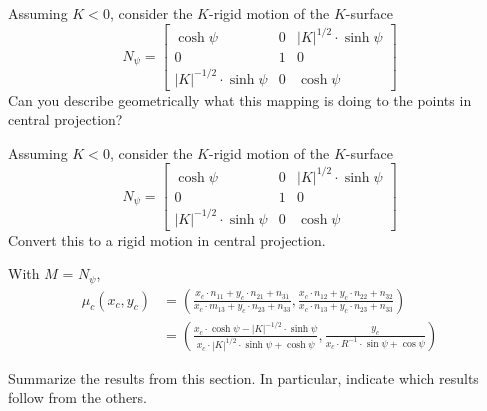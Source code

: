 \documentclass{ximera}
\begin{document}
\begin{problem}
  Assuming $K < 0$, consider the $K$-rigid motion of the $K$-surface
  \[
  N_\psi=
  \begin{bmatrix}
    \cosh\psi & 0 & |K|^{1/2}\cdot\sinh\psi\\
    0 & 1 & 0\\
    |K|^{-1/2}\cdot\sinh\psi & 0 & \cosh\psi
  \end{bmatrix}
  \]
  Can you describe geometrically what this mapping is doing to the
  points in central projection?
\end{problem}

  
\begin{problem}
  Assuming $K < 0$, consider the $K$-rigid motion of the $K$-surface
  \[
  N_\psi=
  \begin{bmatrix}
    \cosh\psi & 0 & |K|^{1/2}\cdot\sinh\psi\\
    0 & 1 & 0\\
    |K|^{-1/2}\cdot\sinh\psi & 0 & \cosh\psi
  \end{bmatrix}
  \]
  Convert this to a rigid motion in central projection.
  
    \begin{freeResponse}
   With $M$ = $N_\psi$,
  \begin{align*}
  \mu_c(x_c,y_c) &= \left( \frac{x_c\cdot n_{11} + y_c\cdot n_{21} + n_{31}}{x_c\cdot m_{13} + y_c\cdot n_{23} + n_{33}},
    \frac{x_c\cdot n_{12} + y_c\cdot n_{22} + n_{32}}{x_c\cdot n_{13} + y_c\cdot n_{23} + n_{33}} \right) \\
    &= \left( \frac{x_c\cdot \cosh\psi -  |K|^{-1/2}\cdot \sinh\psi}{x_c \cdot |K|^{1/2}\cdot \sinh\psi + \cosh\psi},
    \frac{y_c}{x_c\cdot R^{-1} \cdot \sin\psi + \cos\psi} \right) 
  \end{align*}
  \end{freeResponse}
\end{problem}


\begin{problem}
Summarize the results from this section. In particular, indicate which
results follow from the others.
\begin{freeResponse}
\end{freeResponse}
\end{problem}
\end{document}
